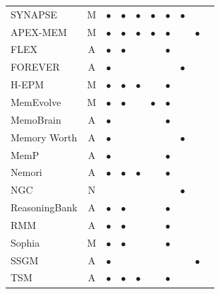 \begin{table}[!t]
\begin{tabular}{@{}lc cccccccc@{}}
SYNAPSE              & M & $\bullet$ & $\bullet$ & $\bullet$ & $\bullet$ & $\bullet$ & $\bullet$ &           &           \\
APEX-MEM             & M & $\bullet$ & $\bullet$ & $\bullet$ & $\bullet$ & $\bullet$ &           & $\bullet$ &           \\
FLEX                 & A & $\bullet$ & $\bullet$ &           &           & $\bullet$ &           &           &           \\
FOREVER              & A & $\bullet$ &           &           &           &           & $\bullet$ &           &           \\
H-EPM                & M & $\bullet$ & $\bullet$ & $\bullet$ &           & $\bullet$ &           &           &           \\
MemEvolve            & M & $\bullet$ & $\bullet$ &           & $\bullet$ & $\bullet$ &           &           &           \\
MemoBrain            & A & $\bullet$ &           &           &           & $\bullet$ &           &           &           \\
Memory Worth         & A & $\bullet$ &           &           &           &           & $\bullet$ &           &           \\
MemP                 & A & $\bullet$ &           &           &           & $\bullet$ &           &           &           \\
Nemori               & A & $\bullet$ & $\bullet$ & $\bullet$ &           & $\bullet$ &           &           &           \\
NGC                  & N &           &           &           &           &           & $\bullet$ &           &           \\
ReasoningBank        & A & $\bullet$ & $\bullet$ &           &           & $\bullet$ &           &           &           \\
RMM                  & A & $\bullet$ & $\bullet$ &           &           & $\bullet$ &           &           &           \\
Sophia               & M & $\bullet$ & $\bullet$ &           &           & $\bullet$ &           &           &           \\
SSGM                 & A & $\bullet$ &           &           &           &           &           & $\bullet$ &           \\
TSM                  & A & $\bullet$ & $\bullet$ & $\bullet$ &           & $\bullet$ &           &           &           \\

\end{tabular}
\end{table}
